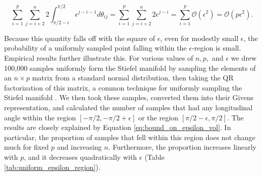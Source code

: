 \documentclass[ba]{imsart}
\numberwithin{equation}{section}
\theoremstyle{plain}
\begin{document}
\begin{equation}
\label{eq:bound_on_epsilon_vol}
\sum_{i=1}^p \sum_{j=i+2}^n 2 \int_{\pi/2-\epsilon}^{\pi/2} \epsilon^{j-i-1} d\theta_{ij} = \sum_{i=1}^p \sum_{j=i+2}^n 2 \epsilon^{j-i} = \sum_{i=1}^p \mathcal{O}(\epsilon^2) = \mathcal{O}(p \epsilon^2).
\end{equation}

\noindent Because this quantity falls off with the square of $\epsilon$, even for modestly small $\epsilon$, the probability of a uniformly sampled point falling within the $\epsilon$-region is small. Empirical results further illustrate this. For various values of $n, p,$ and $\epsilon$ we drew 100,000 samples uniformly form the Stiefel manifold by sampling the elements of an $n \times p$ matrix from a standard normal distribution, then taking the QR factorization of this matrix, a common technique for uniformly sampling the Stiefel manifold \citep{muirhead2009aspects}. We then took these samples, converted them into their Givens representation, and calculated the number of samples that had any longitudinal angle within the region $[-\pi/2, -\pi/2+\epsilon]$ or the region $[\pi/2-\epsilon, \pi/2]$. The results are closely explained by Equation \ref{eq:bound_on_epsilon_vol}. In particular, the proportion of samples that fell within this region does not change much for fixed $p$ and increasing $n$. Furthermore, the proportion increases linearly with $p$, and it decreases quadratically with $\epsilon$ (Table \ref{tab:uniform_epsilon_region}).  
\end{document}
